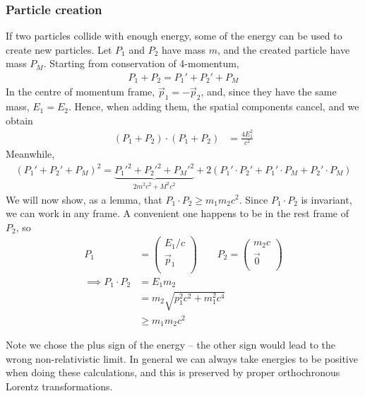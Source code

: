\documentclass{../../template/note}
\begin{document}

    \subsubsection{Particle creation}

    If two particles collide with enough energy, some of the energy can be used to create new particles. Let $P_1$ and $P_2$ have mass $m$, and the created particle have mass $P_M$. Starting from conservation of 4-momentum,
    \begin{align*}
        P_1 + P_2 = P_1' + P_2' + P_M
    \end{align*}
    In the centre of momentum frame, $\vec p_1 = -\vec p_2$, and, since they have the same mass, $E_1 = E_2$. Hence, when adding them, the spatial components cancel, and we obtain
    \begin{align*}
        (P_1+P_2) \cdot (P_1+P_2) &= \frac{4E_1^2}{c^2}
    \end{align*}
    Meanwhile,
    \begin{align*}
        (P_1'+P_2'+P_M)^2 = \underbrace{P_1'^2 + P_2'^2 + P_M'^2}_{2m^2c^2 + M^2c^2} + 2(P_1'\cdot P_2' + P_1'\cdot P_M + P_2' \cdot P_M)
    \end{align*}
    We will now show, as a lemma, that $P_1 \cdot P_2 \geq m_1m_2c^2$. Since $P_1 \cdot P_2$ is invariant, we can work in any frame. A convenient one happens to be in the rest frame of $P_2$, so
    \begin{align*}
        P_1 &= \begin{pmatrix}
            E_1/c \\
            \vec p_1 \\
        \end{pmatrix} \qquad P_2 = \begin{pmatrix}
            m_2c \\
            \vec 0 \\
        \end{pmatrix} \\
        \implies P_1 \cdot P_2 &= E_1m_2 \\
        &= m_2 \sqrt{p_1^2 c^2 + m_1^2 c^4} \\
        &\geq m_1m_2c^2
    \end{align*}
    
    Note we chose the plus sign of the energy -- the other sign would lead to the wrong non-relativistic limit. In general we can always take energies to be positive when doing these calculations, and this is preserved by proper orthochronous Lorentz transformations.
    
\end{document}
